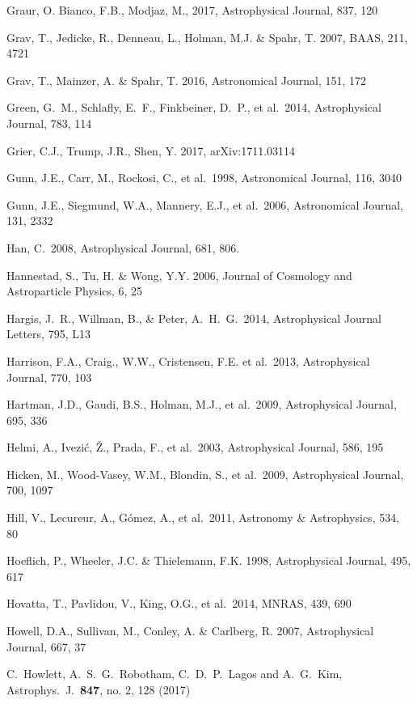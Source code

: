 \documentclass[twocolumn]{aastex61}
\begin{document}
\begin{thebibliography}{}
\bibitem[()]{} Graur, O. Bianco, F.B., Modjaz, M., 2017, Astrophysical Journal, 837, 120

\bibitem[()]{} Grav, T., Jedicke, R., Denneau, L., Holman, M.J.  \& Spahr, T. 2007, BAAS, 211, 4721

\bibitem[()]{} Grav, T., Mainzer, A. \& Spahr, T. 2016, Astronomical Journal, 151, 172

\bibitem[()]{} Green, G.~M., Schlafly, E.~F., Finkbeiner, D.~P., et al.~2014, Astrophysical Journal, 783, 114

\bibitem[()]{} Grier, C.J., Trump, J.R., Shen, Y. 2017, arXiv:1711.03114

\bibitem[()]{} Gunn, J.E., Carr, M., Rockosi, C., et al.~1998, Astronomical Journal, 116, 3040

\bibitem[()]{} Gunn, J.E., Siegmund, W.A., Mannery, E.J., et al.~2006, Astronomical Journal, 131, 2332

\bibitem[()]{} Han, C.~2008, Astrophysical Journal, 681, 806.

\bibitem[()]{} Hannestad, S., Tu, H. \& Wong, Y.Y. 2006, Journal of Cosmology and Astroparticle
             Physics, 6, 25

\bibitem[()]{} Hargis, J.~R., Willman, B., \& Peter, A.~H.~G.\ 2014, Astrophysical Journal Letters, 795, L13

\bibitem[()]{} Harrison, F.A., Craig., W.W., Cristensen, F.E. et
  al.~2013, Astrophysical Journal, 770, 103

\bibitem[()]{} Hartman, J.D., Gaudi, B.S., Holman, M.J., et al.~2009, Astrophysical Journal, 695, 336

\bibitem[()]{} Helmi, A., Ivezi\'{c}, \v{Z}., Prada, F., et al.~2003, Astrophysical Journal, 586, 195

\bibitem[()]{} Hicken, M., Wood-Vasey, W.M., Blondin, S., et al.~2009, Astrophysical Journal, 700, 1097

\bibitem[()]{} Hill, V., Lecureur, A., G{\'o}mez, A., et al.~2011, Astronomy \& Astrophysics, 534, 80

\bibitem[()]{} Hoeflich, P., Wheeler, J.C. \& Thielemann, F.K. 1998, Astrophysical Journal, 495, 617

\bibitem[()]{} Hovatta, T., Pavlidou, V., King, O.G., et al.~2014, MNRAS, 439, 690

\bibitem[()]{} Howell, D.A., Sullivan, M., Conley, A. \& Carlberg, R. 2007, Astrophysical Journal, 667, 37

\bibitem[()]{} C.~Howlett, A.~S.~G.~Robotham, C.~D.~P.~Lagos and A.~G.~Kim, Astrophys.\ J.\  {\bf 847}, no. 2, 128 (2017)


\end{thebibliography}
\end{document}
